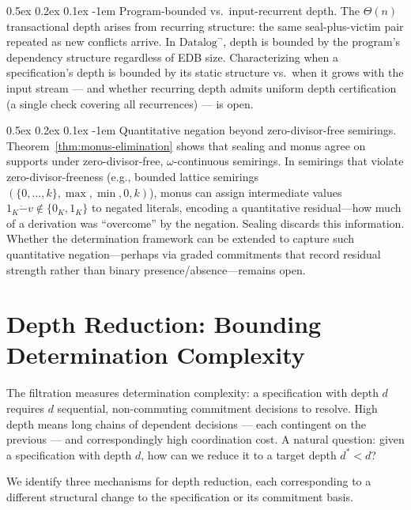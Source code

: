 \documentclass[acmsmall,review,anonymous]{acmart}
\makeatletter
\renewcommand{\paragraph}{\@startsection{paragraph}{4}{\z@}%
  {0.5ex \@plus 0.2ex \@minus 0.1ex}%
  {-1em}%
  {\normalfont\normalsize\bfseries}}
\theoremstyle{remark}
\numberwithin{definition}{section}
\numberwithin{theorem}{section}
\numberwithin{lemma}{section}
\numberwithin{corollary}{section}
\numberwithin{remark}{section}
\numberwithin{example}{section}
\numberwithin{observation}{section}
\numberwithin{assumption}{section}
\makeatother
\begin{document}
\paragraph{Program-bounded vs.\ input-recurrent depth.}
The $\Theta(n)$ transactional depth arises from recurring structure:
the same seal-plus-victim pair repeated as new conflicts arrive.
In $\mbox{Datalog}^\neg$, depth is bounded by the program's dependency
structure regardless of EDB size.
Characterizing when a specification's depth is bounded by its static
structure vs.\ when it grows with the input stream --- and whether
recurring depth admits uniform depth certification (a single check
covering all recurrences) --- is open.

\paragraph{Quantitative negation beyond zero-divisor-free semirings.}
Theorem~\ref{thm:monus-elimination} shows that sealing and monus agree
on supports under zero-divisor-free, $\omega$-continuous semirings.
In semirings that violate zero-divisor-freeness (e.g., bounded
lattice semirings $(\{0,\ldots,k\}, \max, \min, 0, k)$), monus can
assign intermediate values $1_K \mathbin{\dot{-}} v \notin \{0_K, 1_K\}$
to negated literals, encoding a quantitative residual---how much of a
derivation was ``overcome'' by the negation.
Sealing discards this information.
Whether the determination framework can be extended to capture such
quantitative negation---perhaps via graded commitments that record
residual strength rather than binary presence/absence---remains open.

\section{Depth Reduction: Bounding Determination Complexity}
\label{app:depth-reduction}
\label{sec:relaxation}

The filtration measures determination complexity: a specification with
depth $d$ requires $d$ sequential, non-commuting commitment decisions
to resolve.
High depth means long chains of dependent decisions --- each contingent
on the previous --- and correspondingly high coordination cost.
A natural question: given a specification with depth $d$, how can we
reduce it to a target depth $d^* < d$?

We identify three mechanisms for depth reduction, each corresponding to
a different structural change to the specification or its commitment
basis.
\end{document}
